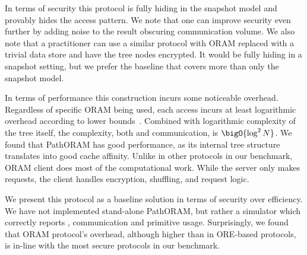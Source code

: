 		In terms of security this protocol is fully hiding in the snapshot model and provably hides the access pattern.
		We note that one can improve security even further by adding noise to the result obscuring communication volume.
		We also note that a practitioner can use a similar protocol with ORAM replaced with a trivial data store and have the tree nodes encrypted.
		It would be fully hiding in a snapshot setting, but we prefer the baseline that covers more than only the snapshot model.

		In terms of performance this construction incurs some noticeable overhead.
		Regardless of specific ORAM being used, each access incurs at least logarithmic overhead according to lower bounds~\cite{oram-original}.
		Combined with logarithmic complexity of the {\BPlus} tree itself, the complexity, both {\IO} and communication, is $\bigO{\log^2 N}$.
		We found that PathORAM has good {\IO} performance, as its internal tree structure translates into good cache affinity.
		Unlike in other protocols in our benchmark, ORAM client does most of the computational work.
		While the server only makes {\IO} requests, the client handles encryption, shuffling, and request logic.

		We present this protocol as a baseline solution in terms of security over efficiency.
		We have not implemented stand-alone PathORAM, but rather a simulator which correctly reports {\IO}, communication and primitive usage.
		Surprisingly, we found that ORAM protocol's overhead, although higher than in ORE-based protocols, is in-line with the most secure protocols in our benchmark.
